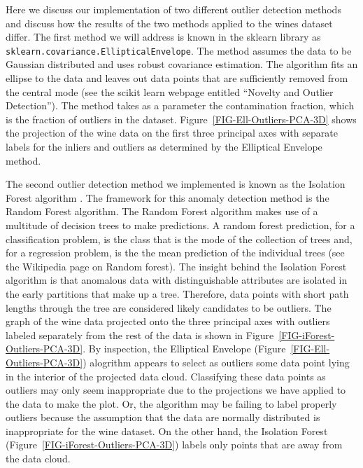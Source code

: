\documentclass[12pt,preprint]{aastex61}
\begin{document}
 Here we discuss our implementation of two different outlier detection
methods and discuss how the results of the two methods applied to the
wines dataset differ. The first method we will address is known in the
sklearn library as \texttt{sklearn.covariance.EllipticalEnvelope}. The
method assumes the data to be Gaussian distributed and uses robust
covariance estimation.  The algorithm fits an ellipse to the data and
leaves out data points that are sufficiently removed from the central
mode (see the scikit learn webpage entitled ``Novelty and Outlier
Detection''). The method takes as a parameter the contamination
fraction, which is the fraction of outliers in the
dataset. Figure~\ref{FIG-Ell-Outliers-PCA-3D} shows the projection of
the wine data on the first three principal axes with separate labels
for the inliers and outliers as determined by the Elliptical Envelope
method.

The second outlier detection method we implemented is known as the
Isolation Forest algorithm \citep{Liu_etal_2008}. The framework for
this anomaly detection method is the Random Forest algorithm. The
Random Forest algorithm makes use of a multitude of decision trees to
make predictions. A random forest prediction, for a classification
problem, is the class that is the mode of the collection of trees and,
for a regression problem, is the the mean prediction of the individual
trees (see the Wikipedia page on Random forest). The insight behind
the Isolation Forest algorithm is that anomalous data with
distinguishable attributes are isolated in the early partitions that
make up a tree. Therefore, data points with short path lengths through
the tree are considered likely candidates to be outliers. The graph of
the wine data projected onto the three principal axes with outliers
labeled separately from the rest of the data is shown in
Figure~\ref{FIG-iForest-Outliers-PCA-3D}. By inspection, the
Elliptical Envelope (Figure~\ref{FIG-Ell-Outliers-PCA-3D}) alogrithm
appears to select as outliers some data point lying in the interior of
the projected data cloud. Classifying these data points as outliers
may only seem inappropriate due to the projections we have applied to
the data to make the plot. Or, the algorithm may be failing to label
properly outliers because the assumption that the data are normally
distributed is inappropriate for the wine dataset. On the other hand,
the Isolation Forest (Figure~\ref{FIG-iForest-Outliers-PCA-3D}) labels
only points that are away from the data cloud.
\end{document}
